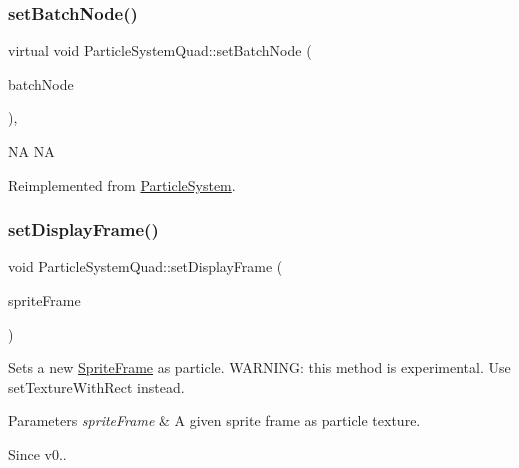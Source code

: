 \mbox{\label{classParticleSystemQuad_aebafe7b796960463ca8c16358c8d819f}} 
\subsubsection{\texorpdfstring{set\+Batch\+Node()}{setBatchNode()}\hspace{0.1cm}{\footnotesize\ttfamily [2/2]}}
{\footnotesize\ttfamily virtual void Particle\+System\+Quad\+::set\+Batch\+Node (\begin{DoxyParamCaption}\item[{\hyperlink{classParticleBatchNode}{Particle\+Batch\+Node} $\ast$}]{batch\+Node }\end{DoxyParamCaption})\hspace{0.3cm}{\ttfamily [override]}, {\ttfamily [virtual]}}

NA  NA 

Reimplemented from \hyperlink{classParticleSystem_a7758a2ae122f4fb48568412c3ce75146}{Particle\+System}.

\mbox{\label{classParticleSystemQuad_a8a9c1216cee41ca83f508da8a65529d1}} 
\subsubsection{\texorpdfstring{set\+Display\+Frame()}{setDisplayFrame()}\hspace{0.1cm}{\footnotesize\ttfamily [1/2]}}
{\footnotesize\ttfamily void Particle\+System\+Quad\+::set\+Display\+Frame (\begin{DoxyParamCaption}\item[{\hyperlink{classSpriteFrame}{Sprite\+Frame} $\ast$}]{sprite\+Frame }\end{DoxyParamCaption})}

Sets a new \hyperlink{classSpriteFrame}{Sprite\+Frame} as particle. W\+A\+R\+N\+I\+NG\+: this method is experimental. Use set\+Texture\+With\+Rect instead.


\begin{DoxyParams}{Parameters}
{\em sprite\+Frame} & A given sprite frame as particle texture. \\
\hline
\end{DoxyParams}
\begin{DoxySince}{Since}
v0.. 
\end{DoxySince}
\mbox{\label{classParticleSystemQuad_a8a9c1216cee41ca83f508da8a65529d1}} 
